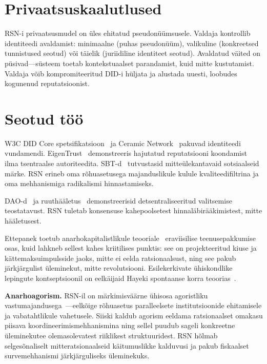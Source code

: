 \documentclass[11pt,a4paper,twocolumn]{article}
\begin{document}
\section{Privaatsuskaalutlused}

RSN-i privaatsusmudel on üles ehitatud pseudonüümsusele. Valdaja kontrollib identiteedi avaldamist: minimaalne (puhas pseudonüüm), valikuline (konkreetsed tunnistused seotud) või täielik (juriidiline identiteet seotud). Avaldatud väited on püsivad---süsteem toetab kontekstuaalset parandamist, kuid mitte kustutamist. Valdaja võib kompromiteeritud DID-i hüljata ja alustada uuesti, loobudes kogunenud reputatsioonist.

\section{Seotud töö}

W3C DID Core spetsifikatsioon~\cite{did2022} ja Ceramic Network~\cite{ceramic2023} pakuvad identiteedi vundamendi. EigenTrust~\cite{kamvar2003} demonstreeris hajutatud reputatsiooni koondamist ilma tsentraalse autoriteedita. SBT-d~\cite{weyl2022} tutvustasid mitteülekantavaid sotsiaalseid märke. RSN erineb oma rõhuasetusega majanduslikule kulule kvaliteedifiltrina ja oma mehhanismiga radikalismi hinnastamiseks.

DAO-d~\cite{buterin2014} ja ruuthääletus~\cite{buterin2019} demonstreerisid detsentraliseeritud valitsemise teostatavust. RSN tuletab konsensuse kahepoolsetest hinnaläbirääkimistest, mitte hääletusest.

Ettepanek toetub anarhokapitalistlikule teooriale~\cite{rothbard1973,hoppe2001} eraviisilise teenusepakkumise osas, kuid lahkneb sellest kahes kriitilises punktis: see on projekteeritud kiuse ja kättemaksuimpulsside jaoks, mitte ei eelda ratsionaalsust, ning see pakub järkjärgulist üleminekut, mitte revolutsiooni. Esilekerkivate ühiskondlike lepingute kontseptsioonil on eelkäijaid Hayeki spontaanse korra teoorias~\cite{hayek1973}.

\textbf{Anarhoagorism.} RSN-il on märkimisväärne ühisosa agoristliku vastumajandusega~\cite{konkin2006}---eelkõige rõhuasetus paralleelsete institutsioonide ehitamisele ja vabatahtlikule vahetusele. Siiski kaldub agorism eeldama ratsionaalset omakasu piisava koordineerimismehhanismina ning sellel puudub sageli konkreetne üleminekutee olemasolevatest riiklikest struktuuridest. RSN hõlmab selgesõnaliselt mitteratsionaalseid käitumuslikke kalduvusi ja pakub fiskaalset survemehhanismi järkjärguliseks üleminekuks.
\end{document}
